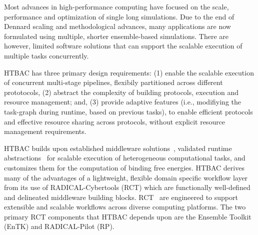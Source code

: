 
Most advances in high-performance computing have focused on the scale,
performance and optimization of single long simulations. Due to the end of
Dennard scaling and methodological advances, many applications are now
formulated using multiple, shorter ensemble-based simulations. There are
however, limited software solutions that can support the scalable execution of
multiple tasks concurrently.

HTBAC has three primary design requirements\@: (1) enable the scalable
execution of concurrent multi-stage pipelines, flexibily partitioned across
different prototocols, (2) abstract the complexity of building protocols,
execution and resource management; and, (3) provide adaptive features (i.e.,
modifiying the task-graph during runtime, based on previous tasks), to enable
efficient protocols and effective resource sharing across protocols, without
explicit resource management requirements.



HTBAC builds upon established middleware solutions~\cite{review_bb_2016},
validated runtime abstractions~\cite{turilli2017comprehensive} for scalable
execution of heterogeneous computational tasks, and customizes them for the
computation of binding free energies. HTBAC derives many of the advantages of
a lightweight, flexible domain specific workflow layer from its use of
RADICAL-Cybertools (RCT) which are functionally well-defined and delineated
middleware building blocks. RCT~\cite{review_bb_2016} are engineered to
support extensible and scalable workflows across diverse computing platforms.
The two primary RCT components that HTBAC depends upon are the Ensemble
Toolkit (EnTK) and RADICAL-Pilot (RP). 


